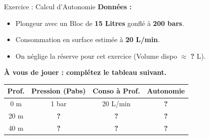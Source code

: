 \begin{frame}{Exercice : Calcul d'Autonomie}
    \textbf{Données :}
    \begin{itemize}
        \item Plongeur avec un Bloc de \textbf{15 Litres} gonflé à \textbf{200 bars}.
        \item Consommation en surface estimée à \textbf{20 L/min}.
        \item On néglige la réserve pour cet exercice (Volume dispo $\approx$ \textbf{?} L).
    \end{itemize}
    
    \vspace{0.5cm}
    
    \textbf{À vous de jouer : complétez le tableau suivant.}
    
    \begin{table}[]
        \centering
        \renewcommand{\arraystretch}{1.5} %
        \begin{tabular}{cccc}
        \toprule
        \textbf{Prof.} & \textbf{Pression (Pabs)} & \textbf{Conso à Prof.} & \textbf{Autonomie} \\
        \midrule
        0 m    & 1 bar       & 20 L/min         & \textbf{?} \\ 
        \hline
        20 m   & \textbf{?}  & \textbf{?}       & \textbf{?} \\ 
        \hline
        40 m   & \textbf{?}  & \textbf{?}       & \textbf{?} \\ 
        \bottomrule
        \end{tabular}
    \end{table}
\end{frame}

